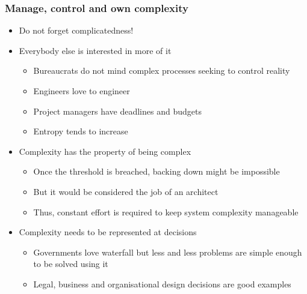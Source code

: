 \documentclass[10pt, compress]{beamer}
\begin{document}
\begin{frame}[fragile]
	\frametitle{Manage, control and own complexity}
	
	\begin{itemize}
		\item Do not forget complicatedness!
		\item Everybody else is interested in more of it
		\begin{itemize}
			\item Bureaucrats do not mind complex processes seeking to control reality
			\item Engineers love to engineer
			\item Project managers have deadlines and budgets
			\item Entropy tends to increase
		\end{itemize}
		\item Complexity has the property of being complex
		\begin{itemize}
			\item Once the threshold is breached, backing down might be impossible
			\item But it would be considered the job of an architect
			\item Thus, constant effort is required to keep system complexity manageable
		\end{itemize}
		\item Complexity needs to be represented at decisions
		\begin{itemize}
			\item Governments love waterfall but less and less problems are simple enough to be solved using it
			\item Legal, business and organisational design decisions are good examples
		\end{itemize}		
	\end{itemize}
\end{frame}
\end{document}
